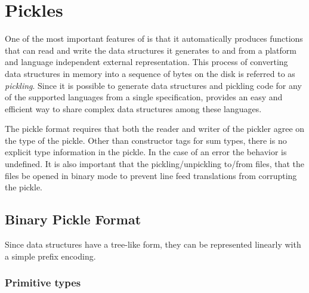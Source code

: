 %
\chapter{Pickles}
\label{chap:pickles}

One of the most important features of \asdlgen{} is that it automatically
produces functions that can read and write the data structures it generates
to and from a platform and language independent external
representation.
This process of converting data structures in memory into a
sequence of bytes on the disk is referred to as \emph{pickling}.
Since it is possible to generate data structures and pickling code for
any of the supported languages from a single \asdl{} specification,
\asdlgen{} provides an easy
and efficient way to share complex data structures among these languages.

The \asdl{} pickle format requires that both the reader and writer
of the pickler agree on the type of the pickle.
Other than constructor tags for sum types, there is no explicit type
information in the pickle.
In the case of an error the behavior is undefined.
It is also important that the pickling/unpickling to/from files, that the
files be opened in binary mode to prevent line feed translations from corrupting
the pickle.

\section{Binary Pickle Format}

Since \asdl{} data structures have a tree-like form, they can be represented
linearly with a simple prefix encoding.

\subsection{Primitive types}

